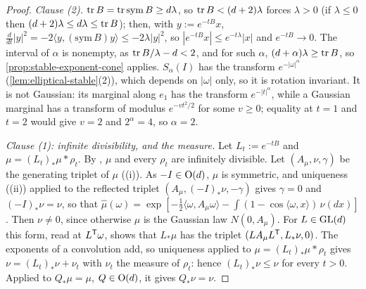 \begin{proof}
\leanok
\emph{Clause (2).} $\operatorname{tr} B = \operatorname{tr}\mathrm{sym}\,B \ge d\lambda$, so $\operatorname{tr} B < (d+2)\lambda$ forces
$\lambda > 0$ (if $\lambda \le 0$ then $(d+2)\lambda \le d\lambda \le \operatorname{tr} B$); then, with
$y := e^{-tB}x$, $\tfrac{d}{dt}|y|^2 = -2\langle y,(\mathrm{sym}\,B)y\rangle \le -2\lambda|y|^2$, so
$|e^{-tB}x| \le e^{-t\lambda}|x|$ and $e^{-tB} \to 0$. The interval of $\alpha$ is nonempty, as
$\operatorname{tr} B/\lambda - d < 2$, and for such $\alpha$, $(d+\alpha)\lambda \ge \operatorname{tr} B$, so
\ref{prop:stable-exponent-cone} applies. $S_\alpha(I)$ has the transform $e^{-|\omega|^\alpha}$
(\ref{lem:elliptical-stable}(2)), which depends on $|\omega|$ only, so it is rotation invariant. It is
not Gaussian: its marginal along $e_1$ has the transform $e^{-|t|^\alpha}$, while a Gaussian marginal
has a transform of modulus $e^{-vt^2/2}$ for some $v \ge 0$; equality at $t = 1$ and $t = 2$ would give
$v = 2$ and $2^\alpha = 4$, so $\alpha = 2$.

\emph{Clause (1): infinite divisibility, and the \Levy{} measure.} Let $L_t := e^{-tB}$ and
$\mu = (L_t)_*\mu * \rho_t$. By , $\mu$ and every $\rho_t$ are infinitely divisible.
Let $(A_\mu, \nu, \gamma)$ be the generating triplet of $\mu$ ((i)). As $-I \in \mathrm{O}(d)$,
$\mu$ is symmetric, and uniqueness ((ii)) applied to the reflected triplet
$(A_\mu, (-I)_*\nu, -\gamma)$ gives $\gamma = 0$ and $(-I)_*\nu = \nu$, so that
$\widehat\mu(\omega) = \exp[-\frac12\langle \omega,A_\mu \omega\rangle - \int(1 - \cos\langle \omega,x\rangle)\,\nu(dx)]$.
Then $\nu \ne 0$, since otherwise $\mu$ is the Gaussian law $N(0, A_\mu)$. For $L \in \mathrm{GL}(d)$ this form,
read at $L^{\mathsf{T}}\omega$, shows that $L_*\mu$ has the triplet $(LA_\mu L^{\mathsf{T}}, L_*\nu, 0)$. The exponents of
a convolution add, so uniqueness applied to $\mu = (L_t)_*\mu * \rho_t$ gives $\nu = (L_t)_*\nu + \nu_t$
with $\nu_t$ the \Levy{} measure of $\rho_t$: hence $(L_t)_*\nu \le \nu$ for every $t > 0$. Applied to
$Q_*\mu = \mu$, $Q \in \mathrm{O}(d)$, it gives $Q_*\nu = \nu$.


\end{proof}
